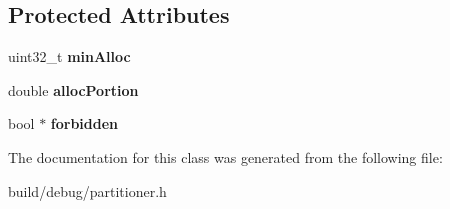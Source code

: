 \subsection*{Protected Attributes}
\begin{DoxyCompactItemize}
\item 
\hypertarget{classPartitioner_a4b821ae6e37d1fc5ebcaffe2055975a8}{uint32\-\_\-t {\bfseries min\-Alloc}}\label{classPartitioner_a4b821ae6e37d1fc5ebcaffe2055975a8}

\item 
\hypertarget{classPartitioner_a73154e282c382e629637431630fb16a0}{double {\bfseries alloc\-Portion}}\label{classPartitioner_a73154e282c382e629637431630fb16a0}

\item 
\hypertarget{classPartitioner_a4005e27a1232a4a6f193fe34ebedd4b6}{bool $\ast$ {\bfseries forbidden}}\label{classPartitioner_a4005e27a1232a4a6f193fe34ebedd4b6}

\end{DoxyCompactItemize}


The documentation for this class was generated from the following file\-:\begin{DoxyCompactItemize}
\item 
build/debug/partitioner.\-h\end{DoxyCompactItemize}
